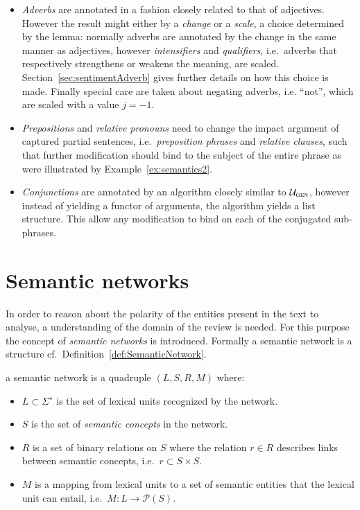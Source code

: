 \begin{itemize}
	\item \emph{Adverbs} are annotated in a fashion closely related to that of adjectives. However the result might either by a \emph{change} or a \emph{scale}, a choice determined by the lemma: normally adverbs are annotated by the change in the same manner as adjectives, however \emph{intensifiers} and \emph{qualifiers}, i.e.\ adverbs that respectively strengthens or weakens the meaning, are scaled. Section~\ref{sec:sentimentAdverb} gives further details on how this choice is made. Finally special care are taken about negating adverbs, i.e. ``not'', which are scaled with a value $j = -1$.

	\item \emph{Prepositions} and \emph{relative pronouns} need to change the impact argument of captured partial sentences, i.e.\ \emph{preposition phrases} and \emph{relative clauses}, such that further modification should bind to the subject of the entire phrase as were illustrated by Example~\ref{ex:semantics2}.

	\item \emph{Conjunctions} are annotated by an algorithm closely similar to $\mathcal{U}_\textsc{gen}$, however instead of yielding a functor of arguments, the algorithm yields a list structure. This allow any modification to bind on each of the conjugated sub-phrases.
	
\end{itemize}


\section{Semantic networks}
\label{sec:sentimentValue}

In order to reason about the polarity of the entities present in the text to analyse, a understanding of the domain of the review is needed.  For this purpose the concept of \emph{semantic networks} is introduced. Formally a semantic network is a structure cf.\ Definition~\ref{def:SemanticNetwork}.
\begin{definition}
a semantic network is a quadruple $(L,S,R,M)$ where:\\[-2em]
  \begin{itemize} %
    \item $L \subset \Sigma^\star$ is the set of lexical units recognized by the network.
    \item $S$ is the set of \emph{semantic concepts} in the network.
    \item $R$ is a set of binary relations on $S$ where the relation $r \in R$ describes links\\ between semantic concepts, i.e.\ $r \subset S \times S$. 
    \item $M$ is a mapping from lexical units to a set of semantic entities that the lexical\\ unit can entail, i.e.\ $M: L \to \mathcal{P}(S)$.
  \end{itemize}
  \label{def:SemanticNetwork}
  \vspace{-1em}
  \done
\end{definition}
\vspace{-2em}

